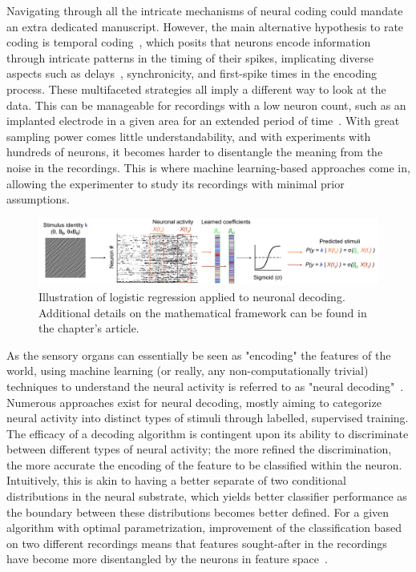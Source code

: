 Navigating through all the intricate mechanisms of neural coding could mandate an extra dedicated manuscript. However, the main alternative hypothesis to rate coding is temporal coding~\cite{engel1992temporal}, which posits that neurons encode information through intricate patterns in the timing of their spikes, implicating diverse aspects such as delays~\cite{grimaldi2022precise}, synchronicity, and first-spike times in the encoding process.
These multifaceted strategies all imply a different way to look at the data. This can be manageable for recordings with a low neuron count, such as an implanted electrode in a given area for an extended period of time~\cite{nougaret2023distinct}. With great sampling power comes little understandability, and with experiments with hundreds of neurons, it becomes harder to disentangle the meaning from the noise in the recordings. This is where machine learning-based approaches come in, allowing the experimenter to study its recordings with minimal prior assumptions.

\begin{figure}[h!tbp]
\vspace{0.1cm}
\centering
\includegraphics[width=1.\textwidth]{fig/chap4_logreg.pdf}
\caption[Illustration of logistic regression applied to neuronal decoding.]{Illustration of logistic regression applied to neuronal decoding. Additional details on the mathematical framework can be found in the chapter's article.}
\label{fig_chap4_logreg} %
\end{figure} 

As the sensory organs can essentially be seen as "encoding" the features of the world, using machine learning (or really, any non-computationally trivial) techniques to understand the neural activity is referred to as "neural decoding"~\cite{meyers2013neural,glaser2020machine}. Numerous approaches exist for neural decoding, mostly aiming to categorize neural activity into distinct types of stimuli through labelled, supervised training. The efficacy of a decoding algorithm is contingent upon its ability to discriminate between different types of neural activity; the more refined the discrimination, the more accurate the encoding of the feature to be classified within the neuron. Intuitively, this is akin to having a better separate of two conditional distributions in the neural substrate, which yields better classifier performance as the boundary between these distributions becomes better defined. For a given algorithm with optimal parametrization, improvement of the classification based on two different recordings means that features sought-after in the recordings have become more disentangled by the neurons in feature space~\cite{bishop2006pattern}. 


